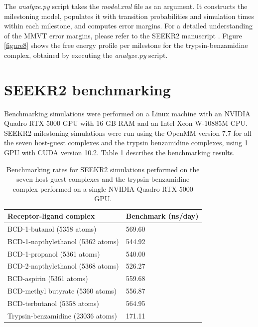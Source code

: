 \documentclass[9pt,training,pubversion]{livecoms}
\begin{document}
\noindent The \textit{analyze.py} script takes the \textit{model.xml} file as an argument. It constructs the milestoning model, populates it with transition probabilities and simulation times within each milestone, and computes error margins. For a detailed understanding of the MMVT error margins, please refer to the SEEKR2 manuscript \cite{votapka2022seekr2}. Figure \ref{figure8} shows the free energy profile per milestone for the trypsin-benzamidine complex, obtained by executing the \textit{analyze.py} script.


\section{SEEKR2 benchmarking}
\vspace{2mm}


\noindent Benchmarking simulations were performed on a Linux machine with an NVIDIA Quadro RTX 5000 GPU with 16 GB RAM and an Intel Xeon W-10885M CPU. SEEKR2 milestoning simulations were run using the OpenMM version 7.7 for all the seven host-guest complexes and the trypsin benzamidine complexes, using 1 GPU with CUDA version 10.2. Table \ref{seekr_benchmarking} describes the benchmarking results. 

\begin{table}[H]
\centering
\begin{tabular}{ |p{5.2 cm}|p{2.0 cm}|}
\hline
\small{\textbf{Receptor-ligand complex}} & \small{\textbf{Benchmark (ns/day)}} \\
\hline
\small{BCD-1-butanol (5358 atoms)} & \small{569.60} \\
\hline
\small{BCD-1-napthylethanol (5362 atoms)}& \small{544.92} \\
\hline
\small{BCD-1-propanol (5361 atoms)} & \small{540.00} \\
\hline
\small{BCD-2-napthylethanol (5368 atoms)} & \small{526.27}  \\
\hline
\small{BCD-aspirin (5361 atoms)} & \small{559.68} \\
\hline
\small{BCD-methyl butyrate (5360 atoms)} & \small{556.87} \\
\hline
\small{BCD-terbutanol (5358 atoms)} & \small{564.95}  \\ 
\hline
\small{Trypsin-benzamidine (23036 atoms)} &  \small{171.11}  \\ 
\hline
\end{tabular}
\vspace{2mm}
\caption{Benchmarking rates for SEEKR2 simulations performed on the seven host-guest complexes and the trypsin-benzamidine complex performed on a single NVIDIA Quadro RTX 5000 GPU.}
\label{seekr_benchmarking}
\end{table}
\end{document}
